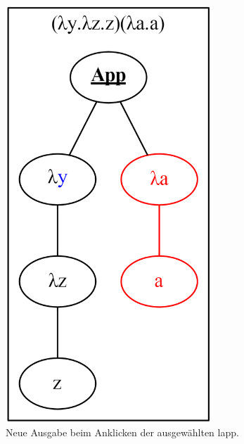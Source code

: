 \documentclass[parskip=full,11pt,twoside]{scrartcl}
\begin{document}
\begin{figure}[H]
\begin{subfigure}{0.25\textwidth}
		\includegraphics[width=0.85\textwidth]{img/displayTree6.png}
		\caption{\label{fig:ltAppTreeB}Neue Ausgabe beim Anklicken der ausgewählten \gls{lapp}.}
	\end{subfigure}
	\hspace*{\fill}
	\begin{subfigure}{0.25\textwidth}
		\centering

\end{subfigure}
\end{figure}
\end{document}
